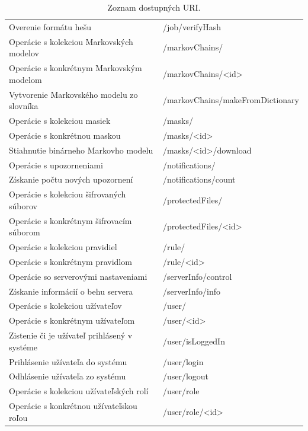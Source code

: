 \documentclass[slovak]{fitthesis}
\begin{document}
\begin{table}[h]
\begin{center}
\begin{tabular}{ |p{8cm}|p{7.4cm}|  }
          Overenie formátu hešu & /job/verifyHash \\
          Operácie s kolekciou Markovských modelov & /markovChains/ \\
          Operácie s konkrétnym Markovským modelom & /markovChains/<id> \\
          Vytvorenie Markovského modelu zo slovníka & /markovChains/makeFromDictionary \\
          Operácie s kolekciou masiek & /masks/ \\
          Operácie s konkrétnou maskou & /masks/<id> \\
          Stiahnutie binárneho Markovho modelu & /masks/<id>/download \\
          Operácie s upozorneniami & /notifications/ \\
          Získanie počtu nových upozornení & /notifications/count \\
          Operácie s kolekciou šifrovaných súborov & /protectedFiles/ \\
          Operácie s konkrétnym šifrovacím súborom & /protectedFiles/<id> \\
          Operácie s kolekciou pravidiel & /rule/ \\
          Operácie s konkrétnym pravidlom & /rule/<id> \\
          Operácie so serverovými nastaveniami & /serverInfo/control \\
          Získanie informácií o behu servera & /serverInfo/info \\
          Operácie s kolekciou užívateľov & /user/ \\
          Operácie s konkrétnym užívateľom & /user/<id> \\
          Zistenie či je užívateľ prihlásený v systéme & /user/isLoggedIn \\
          Prihlásenie užívateľa do systému & /user/login \\
          Odhlásenie užívateľa zo systému & /user/logout \\
          Operácie s kolekciou užívateľských rolí & /user/role \\
          Operácie s konkrétnou užívateľskou roľou & /user/role/<id> \\
         \hline
        \end{tabular}
      \caption{Zoznam dostupných URI.}
      \label{zoznamURItable}
  \end{center}
\end{table}
\end{document}
